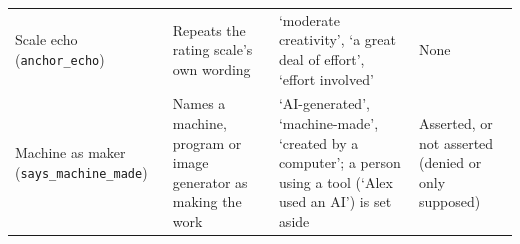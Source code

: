 \begin{table}[tbp]
\begin{tabular}{@{}>{\raggedright\arraybackslash}p{2.6cm}>{\raggedright\arraybackslash}p{3.4cm}>{\raggedright\arraybackslash}p{\dimexpr\textwidth-9.4cm-6\tabcolsep\relax}>{\raggedright\arraybackslash}p{3.4cm}@{}}
\addlinespace
Scale echo (\nolinkurl{anchor_echo}) & Repeats the rating scale's own wording & `moderate creativity', `a great deal of effort', `effort involved' & None\\
\addlinespace
Machine as maker (\nolinkurl{says_machine_made}) & Names a machine, program or image generator as making the work & `AI-generated', `machine-made', `created by a computer'; a person using a tool (`Alex used an AI') is set aside & Asserted, or not asserted (denied or only supposed)\\
\bottomrule
\end{tabular}
\end{table}
